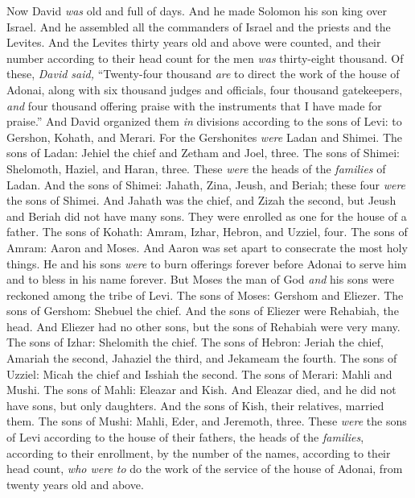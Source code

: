 \begin{biblechapter} %
 Now David \textit{was} old and full of days. And he made Solomon his son king over Israel.
\verse And he assembled all the commanders of Israel and the priests and the Levites.
\verse And the Levites thirty years old and above were counted, and their number according to their head count for the men \textit{was} thirty-eight thousand.
\verse Of these, \textit{David said,} “Twenty-four thousand \textit{are} to direct the work of the house of Adonai, along with six thousand judges and officials,
\verse four thousand gatekeepers, \textit{and} four thousand offering praise with the instruments that I have made for praise.”
\verse And David organized them \textit{in} divisions according to the sons of Levi: to Gershon, Kohath, and Merari.
\verse For the Gershonites \textit{were} Ladan and Shimei.
\verse The sons of Ladan: Jehiel the chief and Zetham and Joel, three.
\verse The sons of Shimei: Shelomoth, Haziel, and Haran, three. These \textit{were} the heads of the \textit{families} of Ladan.
\verse And the sons of Shimei: Jahath, Zina, Jeush, and Beriah; these four \textit{were} the sons of Shimei.
\verse And Jahath was the chief, and Zizah the second, but Jeush and Beriah did not have many sons. They were enrolled as one for the house of a father.
\verse The sons of Kohath: Amram, Izhar, Hebron, and Uzziel, four.
\verse The sons of Amram: Aaron and Moses. And Aaron was set apart to consecrate the most holy things. He and his sons \textit{were} to burn offerings forever before Adonai to serve him and to bless in his name forever.
\verse But Moses the man of God \textit{and} his sons were reckoned among the tribe of Levi.
\verse The sons of Moses: Gershom and Eliezer.
\verse The sons of Gershom: Shebuel the chief.
\verse And the sons of Eliezer were Rehabiah, the head. And Eliezer had no other sons, but the sons of Rehabiah were very many.
\verse The sons of Izhar: Shelomith the chief.
\verse The sons of Hebron: Jeriah the chief, Amariah the second, Jahaziel the third, and Jekameam the fourth.
\verse The sons of Uzziel: Micah the chief and Isshiah the second.
\verse The sons of Merari: Mahli and Mushi. The sons of Mahli: Eleazar and Kish.
\verse And Eleazar died, and he did not have sons, but only daughters. And the sons of Kish, their relatives, married them.
\verse The sons of Mushi: Mahli, Eder, and Jeremoth, three.
\verse These \textit{were} the sons of Levi according to the house of their fathers, the heads of the \textit{families}, according to their enrollment, by the number of the names, according to their head count, \textit{who were to} do the work of the service of the house of Adonai, from twenty years old and above.

\end{biblechapter}

